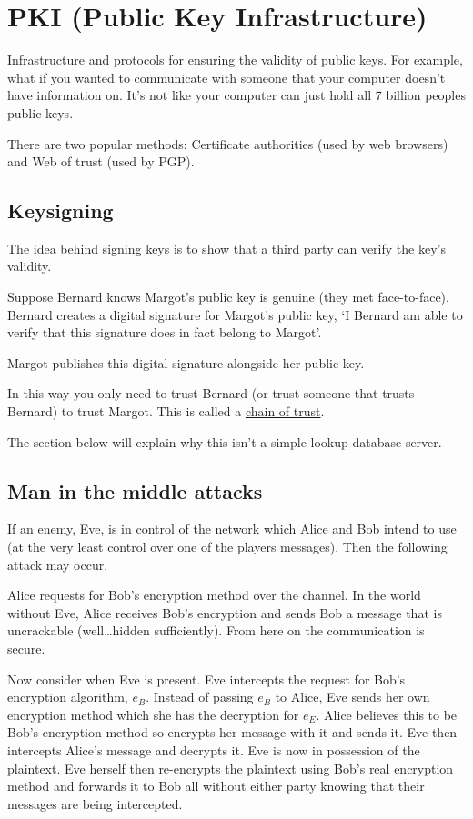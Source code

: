 \documentclass{report}
\begin{document}
\section{PKI (Public Key Infrastructure)}
Infrastructure and protocols for ensuring the validity of public keys. For
example, what if you wanted to communicate with someone that your computer
doesn't have information on. It's not like your computer can just hold all
7 billion peoples public keys.

There are two popular methods: Certificate authorities (used by web browsers)
and Web of trust (used by PGP).

\subsection{Keysigning}
The idea behind signing keys is to show that a third party can verify the
key's validity.

Suppose Bernard knows Margot's public key is genuine (they met face-to-face).
Bernard creates a digital signature for Margot's public key, `I Bernard
am able to verify that this signature does in fact belong to Margot'.

Margot publishes this digital signature alongside her public key.

In this way you only need to trust Bernard (or trust someone that trusts
Bernard) to trust Margot. This is called a \underline{chain of trust}.

The section below will explain why this isn't a simple lookup database server.
\subsection{Man in the middle attacks}
If an enemy, Eve, is in control of the network which Alice and Bob intend to
use (at the very least control over one of the players messages). Then the
following attack may occur.

Alice requests for Bob's encryption method over the channel. In the world
without Eve, Alice receives Bob's encryption and sends Bob a message that
is uncrackable (well\ldots hidden sufficiently). From here on the communication
is secure.

Now consider when Eve is present. Eve intercepts the request for Bob's
encryption algorithm, $e_B$. Instead of passing $e_B$ to Alice,
Eve sends her own encryption method which she has the decryption for $e_E$.
Alice believes this to be Bob's encryption method so encrypts her message
with it and sends it. Eve then intercepts Alice's message and decrypts it.
Eve is now in possession of the plaintext. Eve herself then re-encrypts the
plaintext using Bob's real encryption method and forwards it to Bob
all without either party knowing that their messages are being intercepted.
\end{document}
